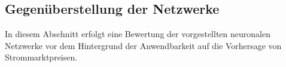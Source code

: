 \newpage
\subsection{Gegenüberstellung der Netzwerke}
In diesem Abschnitt erfolgt eine Bewertung der vorgestellten neuronalen Netzwerke vor dem Hintergrund der Anwendbarkeit auf die Vorhersage von Strommarktpreisen.

\vspace{1cm}

